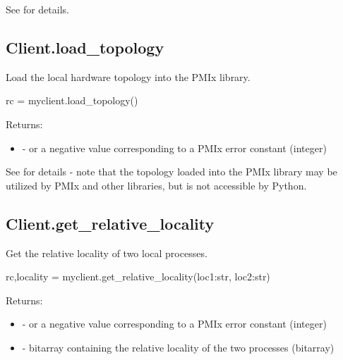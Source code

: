 See  for details.


\subsection{Client.load_topology}

\summary
Load the local hardware topology into the \ac{PMIx} library.

\format

\pyspecificstart
\begin{codepar}
rc = myclient.load_topology()
\end{codepar}
\pyspecificend

Returns:

\begin{itemize}
    \item {} -  or a negative value corresponding to a PMIx error constant (integer)
\end{itemize}

See  for details - note that the topology loaded into the \ac{PMIx} library may be utilized by \ac{PMIx} and other libraries, but is not accessible by Python.


\subsection{Client.get_relative_locality}

\summary
Get the relative locality of two local processes.

\format

\pyspecificstart
\begin{codepar}
rc,locality = myclient.get_relative_locality(loc1:str, loc2:str)
\end{codepar}
\pyspecificend

\begin{arglist}
\end{arglist}


Returns:

\begin{itemize}
    \item {} -  or a negative value corresponding to a PMIx error constant (integer)
    \item {} -  bitarray containing the relative locality of the two processes (bitarray)
\end{itemize}

